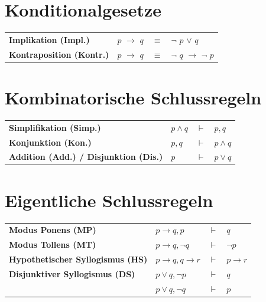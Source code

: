 \documentclass[10.5pt,oneside,a4paper]{paper}
\begin{document}
    \vspace{-0.5\baselineskip}

\section{Konditionalgesetze}

    \begin{tabular}[h]{p{}p{}cl}
      \textbf{Implikation (Impl.)}      & $p$ $\rightarrow$ $q$ & $\equiv$ & $\neg$ $p$ $\vee$ $q$ \\
      \textbf{Kontraposition (Kontr.)}  & $p$ $\rightarrow$ $q$ & $\equiv$ & $\neg$ $q$ $\rightarrow$ $\neg$ $p$ \\
    \end{tabular}

    \vspace{-0.5\baselineskip}

\section{Kombinatorische Schlussregeln}

    \begin{tabular}[h]{p{}p{}cl}
      \textbf{Simplifikation (Simp.)}          & $p\wedge q$              & $\vdash$ & $p,q$ \\
      \textbf{Konjunktion (Kon.)}              & $p,q$                    & $\vdash$ & $p\wedge q$ \\
      \textbf{Addition (Add.) / Disjunktion (Dis.)} & $p$                      & $\vdash$ & $p\vee q$ \\
    \end{tabular}

    \vspace{-0.5\baselineskip}

\section{Eigentliche Schlussregeln}

    \begin{tabular}[h]{p{}p{}cl}
      \textbf{Modus Ponens (MP)}               & $p\rightarrow q, p$              & $\vdash$ & $q$ \\
      \textbf{Modus Tollens (MT)}              & $p\rightarrow q, \neg q$         & $\vdash$ & $\neg p$ \\
      \textbf{Hypothetischer Syllogismus (HS)} & $p\rightarrow q, q\rightarrow r$ & $\vdash$ & $p\rightarrow r$ \\
      \textbf{Disjunktiver Syllogismus (DS)}   & $p\vee q, \neg p$                & $\vdash$ & $q$  \\
                                               & $p\vee q, \neg q$                & $\vdash$ & $p$ \\
    \end{tabular}
\end{document}
